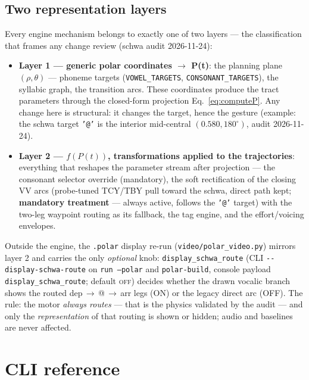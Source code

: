 \documentclass[11pt,a4paper]{article}
\begin{document}
\subsection{Two representation layers}
\label{sec:layers}

Every engine mechanism belongs to exactly one of two layers --- the
classification that frames any change review (schwa audit
2026-11-24):

\begin{itemize}[leftmargin=1.5em]
\item \textbf{Layer 1 --- generic polar coordinates \(\to\) P(t)}:
      the planning plane \((\rho,\theta)\) --- phoneme targets
      (\texttt{VOWEL\_TARGETS}, \texttt{CONSONANT\_TARGETS}), the
      syllabic graph, the transition arcs. These coordinates produce
      the tract parameters through the closed-form projection
      Eq.~\eqref{eq:computeP}. Any change here is structural: it
      changes the target, hence the gesture (example: the schwa
      target \texttt{'@'} is the interior mid-central
      \((0.580, 180^\circ)\), audit 2026-11-24).
\item \textbf{Layer 2 --- \(f(P(t))\), transformations applied to the
      trajectories}: everything that reshapes the parameter stream
      after projection --- the consonant selector override
      (mandatory), the soft rectification of the closing VV arcs
      (probe-tuned TCY/TBY pull toward the schwa, direct path kept;
      \textbf{mandatory treatment} --- always active, follows the
      \texttt{'@'} target) with the two-leg waypoint routing as its
      fallback, the tag engine, and the effort/voicing envelopes.
\end{itemize}

Outside the engine, the \texttt{.polar} display re-run
(\texttt{video/polar\_video.py}) mirrors layer 2 and carries the only
\emph{optional} knob: \texttt{display\_schwa\_route} (CLI
\texttt{-{}-display-schwa-route} on \texttt{run --polar} and
\texttt{polar-build}, console payload \texttt{display\_schwa\_route};
default \textsc{off}) decides whether the drawn vocalic branch shows
the routed dep\,$\to$\,@\,$\to$\,arr legs (ON) or the legacy direct
arc (OFF). The rule: the motor \emph{always routes} --- that is the
physics validated by the audit --- and only the \emph{representation}
of that routing is shown or hidden; audio and baselines are never
affected.

\section{CLI reference}\label{sec:cli}
\end{document}
